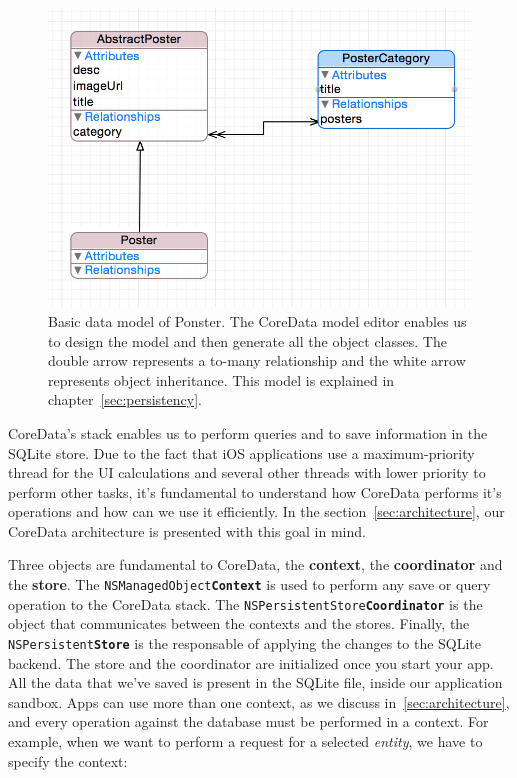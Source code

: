 \begin{figure}
\centering
\includegraphics[scale=0.85]{img/coredata.png}
\caption{\label{fig:coredata}Basic data model of Ponster. The CoreData model editor
  enables us to design the model and then generate all the object classes. The
  double arrow represents a to-many relationship and the white arrow represents
  object inheritance. This model is explained in chapter~\ref{sec:persistency}.}
\end{figure} 

CoreData's stack enables us to perform queries and to save information in the SQLite
store. Due to the fact that iOS applications use a maximum-priority thread for the
UI calculations and several other threads with lower priority to perform other
tasks, it's fundamental to understand how CoreData performs it's operations and how
can we use it efficiently. In the section~\ref{sec:architecture}, our CoreData
architecture is presented with this goal in mind.

Three objects are fundamental to CoreData, the \textbf{context}, the \textbf{coordinator}
and the \textbf{store}. The \texttt{NSManagedObject\textbf{Context}} is used to perform
any save or query operation to the CoreData stack. The
\texttt{NSPersistentStore\textbf{Coordinator}} is the object that communicates
between the contexts and the stores. Finally, the
\texttt{NSPersistent\textbf{Store}} is the responsable of applying the changes to
the SQLite backend. The store and the coordinator are initialized once you start
your app. All the data that we've saved is present in the SQLite file, inside our
application sandbox. Apps can use more than one context, as we discuss
in~\ref{sec:architecture}, and every operation against the database must be
performed in a context. For example, when we want to perform a request for a
selected \textit{entity}, we have to specify the context:

